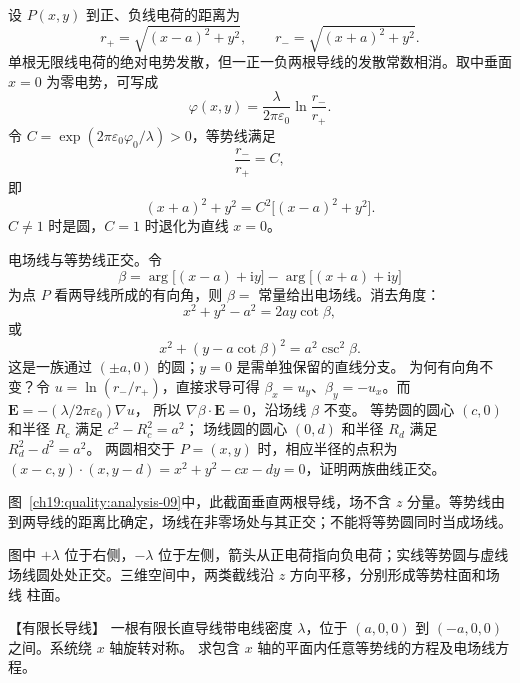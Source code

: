 \begin{xesolution}
设 $P(x,y)$ 到正、负线电荷的距离为
\[
  r_+=\sqrt{(x-a)^2+y^2},\qquad
  r_-=\sqrt{(x+a)^2+y^2}.
\]
单根无限线电荷的绝对电势发散，但一正一负两根导线的发散常数相消。取中垂面 $x=0$ 为零电势，可写成
\[
  \boxed{\varphi(x,y)=\frac{\lambda}{2\pi\varepsilon_0}
  \ln\frac{r_-}{r_+}}.
\]
令 $C=\exp(2\pi\varepsilon_0\varphi_0/\lambda)>0$，等势线满足
\[
  \boxed{\frac{r_-}{r_+}=C},
\]
即
\[
  \boxed{(x+a)^2+y^2=C^2\bigl[(x-a)^2+y^2\bigr]}.
\]
$C\ne1$ 时是圆，$C=1$ 时退化为直线 $x=0$。

电场线与等势线正交。令
\[
  \beta=\arg\bigl[(x-a)+\mathrm i y\bigr]
  -\arg\bigl[(x+a)+\mathrm i y\bigr]
\]
为点 $P$ 看两导线所成的有向角，则 $\beta=$ 常量给出电场线。消去角度：
\[
  \boxed{x^2+y^2-a^2=2ay\cot\beta},
\]
或
\[
  \boxed{x^2+(y-a\cot\beta)^2=a^2\csc^2\beta}.
\]
这是一族通过 $(\pm a,0)$ 的圆；$y=0$ 是需单独保留的直线分支。
为何有向角不变？令 $u=\ln(r_-/r_+)$，直接求导可得
$\beta_x=u_y$、$\beta_y=-u_x$。而 $\boldsymbol E=-(\lambda/2\pi\varepsilon_0)\nabla u$，
所以 $\nabla\beta\cdot\boldsymbol E=0$，沿场线 $\beta$ 不变。
等势圆的圆心 $(c,0)$ 和半径 $R_c$ 满足 $c^2-R_c^2=a^2$；
场线圆的圆心 $(0,d)$ 和半径 $R_d$ 满足 $R_d^2-d^2=a^2$。
两圆相交于 $P=(x,y)$ 时，相应半径的点积为
$ (x-c,y)\cdot(x,y-d)=x^2+y^2-cx-dy=0$，证明两族曲线正交。

\begin{qualityfigure}
\ThTwoLinesAnalysisDrawing
{}\label{ch19:quality:analysis-09}
\end{qualityfigure}
图~\ref{ch19:quality:analysis-09}中，此截面垂直两根导线，场不含 $z$ 分量。等势线由到两导线的距离比确定，场线在非零场处与其正交；不能将等势圆同时当成场线。

图中 $+\lambda$ 位于右侧，$-\lambda$ 位于左侧，箭头从正电荷指向负电荷；实线等势圆与虚线场线圆处处正交。三维空间中，两类截线沿 $z$ 方向平移，分别形成等势柱面和场线
柱面。
\end{xesolution}



\begin{origexamplebox}{【有限长导线】}\label{ch19:ex:s33-2-6}
一根有限长直导线带电线密度 $\lambda$，位于 $(a,0,0)$ 到 $(-a,0,0)$ 之间。系统绕 $x$ 轴旋转对称。
求包含 $x$ 轴的平面内任意等势线的方程及电场线方程。

\ThQFiniteLine
\end{origexamplebox}\par\nopagebreak[4]

